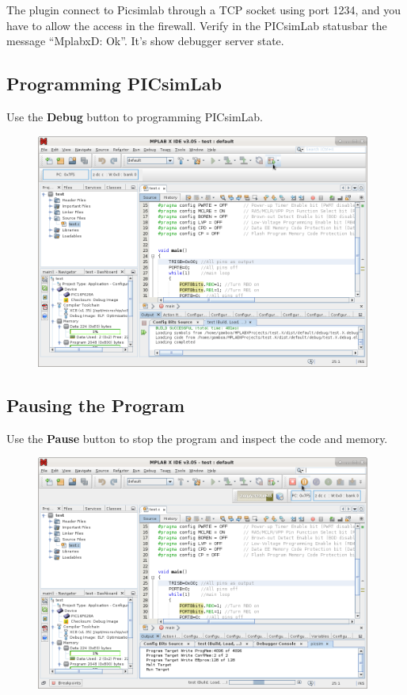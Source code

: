The plugin connect to Picsimlab through a TCP socket using port 1234, and you have to allow the access in the firewall. Verify in the PICsimLab statusbar the message ``MplabxD: Ok''. It's show debugger server state.


\subsection{Programming PICsimLab}

Use the \textbf{Debug} button to programming PICsimLab.  
\begin{figure}[H]
\center
\includegraphics[width=0.98\textwidth]{img/hmd/mplab25.png} 
\end{figure} 

\subsection{Pausing the Program}
Use the \textbf{Pause} button to stop the program and inspect the code and memory.
\begin{figure}[H]
\center
\includegraphics[width=0.98\textwidth]{img/hmd/mplab26.png} 
\end{figure} 

